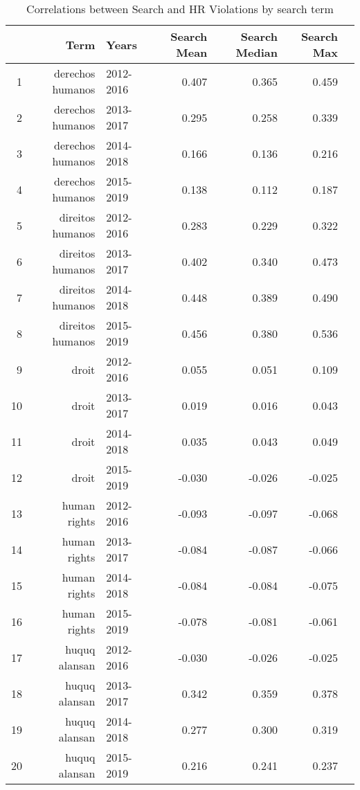 \begin{table}[ht]
\centering
\begin{tabular}{|r|rlrrrr||}
  \hline
 & Term & Years & Search Mean & Search Median & Search Max \\ 
  \hline
1 & derechos humanos & 2012-2016 & 0.407 & 0.365 & 0.459 \\ 
  2 & derechos humanos & 2013-2017 & 0.295 & 0.258 & 0.339 \\ 
  3 & derechos humanos & 2014-2018 & 0.166 & 0.136 & 0.216 \\ 
  4 & derechos humanos & 2015-2019 & 0.138 & 0.112 & 0.187 \\ 
  5 & direitos humanos & 2012-2016 & 0.283 & 0.229 & 0.322 \\ 
  6 & direitos humanos & 2013-2017 & 0.402 & 0.340 & 0.473 \\ 
  7 & direitos humanos & 2014-2018 & 0.448 & 0.389 & 0.490 \\ 
  8 & direitos humanos & 2015-2019 & 0.456 & 0.380 & 0.536 \\ 
  9 & droit & 2012-2016 & 0.055 & 0.051 & 0.109 \\ 
  10 & droit & 2013-2017 & 0.019 & 0.016 & 0.043 \\ 
  11 & droit & 2014-2018 & 0.035 & 0.043 & 0.049 \\ 
  12 & droit & 2015-2019 & -0.030 & -0.026 & -0.025 \\ 
  13 & human rights & 2012-2016 & -0.093 & -0.097 & -0.068 \\ 
  14 & human rights & 2013-2017 & -0.084 & -0.087 & -0.066 \\ 
  15 & human rights & 2014-2018 & -0.084 & -0.084 & -0.075 \\ 
  16 & human rights & 2015-2019 & -0.078 & -0.081 & -0.061 \\ 
  17 & huquq alansan & 2012-2016 & -0.030 & -0.026 & -0.025 \\ 
  18 & huquq alansan & 2013-2017 & 0.342 & 0.359 & 0.378 \\ 
  19 & huquq alansan & 2014-2018 & 0.277 & 0.300 & 0.319 \\ 
  20 & huquq alansan & 2015-2019 & 0.216 & 0.241 & 0.237 \\ 
   \hline
\end{tabular}
\caption{Correlations between Search and HR Violations by search term} 
\end{table}
